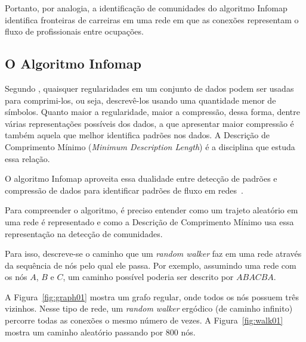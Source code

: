 \documentclass[
  article,
  11pt,
  a4paper,
  english,
  brazil,
  sumario=tradicional]{abntex2}
\begin{document}
Portanto, por analogia, a identificação de comunidades do algoritmo Infomap identifica fronteiras de carreiras em uma rede em que as conexões representam o fluxo de profissionais entre ocupações.

\subsection{O Algoritmo Infomap} \label{sec:infomap}

Segundo , quaisquer regularidades em um conjunto de dados podem ser usadas para comprimi-los, ou seja, descrevê-los usando uma quantidade menor de símbolos. Quanto maior a regularidade, maior a compressão, dessa forma, dentre várias representações possíveis dos dados, a que apresentar maior compressão é também aquela que melhor identifica padrões nos dados. A Descrição de Comprimento Mínimo (\textit{Minimum Description Length}) é a disciplina que estuda essa relação.

O algoritmo Infomap aproveita essa dualidade entre detecção de padrões e compressão de dados para identificar padrões de fluxo em redes~\cite{Rosvall2009-sd}.

Para compreender o algoritmo, é preciso entender como um trajeto aleatório em uma rede é representado e como a Descrição de Comprimento Mínimo usa essa representação na detecção de comunidades.

Para isso, descreve-se o caminho que um \textit{random walker} faz em uma rede através da sequência de nós pelo qual ele passa. Por exemplo, assumindo uma rede com os nós $A$, $B$ e $C$, um caminho possível poderia ser descrito por $ABACBA$.

A Figura~\ref{fig:graph01} mostra um grafo regular, onde todos os nós possuem três vizinhos. Nesse tipo de rede, um \textit{random walker} ergódico (de caminho infinito) percorre todas as conexões o mesmo número de vezes. A Figura~\ref{fig:walk01} mostra um caminho aleatório passando por 800 nós.
\end{document}
